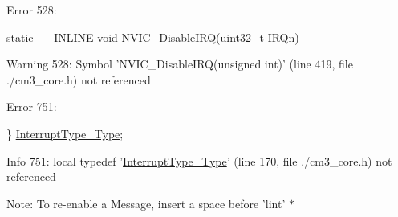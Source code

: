 \begin{DoxyItemize}
\item Error 528\-: \par
 static \-\_\-\-\_\-\-I\-N\-L\-I\-N\-E void N\-V\-I\-C\-\_\-\-Disable\-I\-R\-Q(uint32\-\_\-t I\-R\-Qn) \par
 Warning 528\-: Symbol 'N\-V\-I\-C\-\_\-\-Disable\-I\-R\-Q(unsigned int)' (line 419, file ./cm3\-\_\-core.h) not referenced
\end{DoxyItemize}


\begin{DoxyItemize}
\item Error 751\-: \par
 \} \hyperlink{struct_interrupt_type___type}{Interrupt\-Type\-\_\-\-Type}; \par
 Info 751\-: local typedef '\hyperlink{struct_interrupt_type___type}{Interrupt\-Type\-\_\-\-Type}' (line 170, file ./cm3\-\_\-core.h) not referenced
\end{DoxyItemize}

Note\-: To re-\/enable a Message, insert a space before 'lint' $\ast$ 